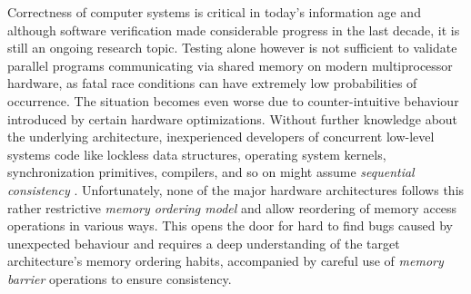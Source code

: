 Correctness of computer systems is critical in today's information age and although software verification made considerable progress in the last decade, it is still an ongoing research topic.
Testing alone however is not sufficient to validate parallel programs
communicating via shared memory on modern multiprocessor hardware,
as fatal race conditions can have extremely low probabilities of occurrence.
The situation becomes even worse due to counter-intuitive behaviour introduced by certain hardware optimizations.
Without further knowledge about the underlying architecture, inexperienced developers of
concurrent
low-level
systems code like lockless data structures, operating system kernels, synchronization
primitives,
compilers,
and so on
might assume
\emph{sequential consistency} \cite{ref:Lamport79}.
Unfortunately, none of the major hardware architectures follows this rather restrictive \emph{memory ordering model} and allow
reordering of memory access operations
in various ways.
This opens the door for hard to find bugs caused by unexpected
behaviour
and
requires a deep understanding of the target architecture's memory ordering habits,
accompanied by careful use of \emph{memory barrier} operations to ensure consistency.



